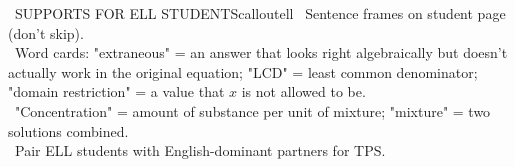 \documentclass[11pt]{article}
\begin{document}
\begin{callout}{\IconGlobe\ SUPPORTS FOR ELL STUDENTS}{calloutell}
\textbullet\ Sentence frames on student page (don't skip).\\
\textbullet\ Word cards: "extraneous" = an answer that looks right algebraically but doesn't actually work in the original equation; "LCD" = least common denominator; "domain restriction" = a value that \(x\) is not allowed to be.\\
\textbullet\ "Concentration" = amount of substance per unit of mixture; "mixture" = two solutions combined.\\
\textbullet\ Pair ELL students with English-dominant partners for TPS.
\end{callout}
\end{document}
